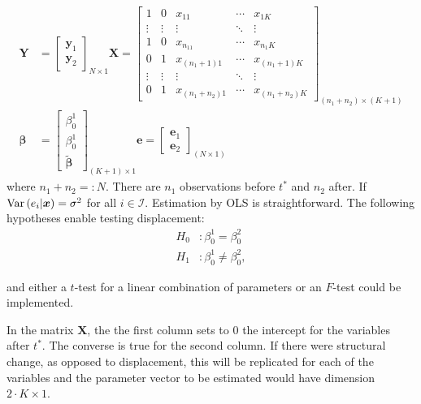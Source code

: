 \begin{align}
	\bm{Y} & = {\begin{bmatrix}
					\bm{y}_1 \\
					\bm{y}_2
			 \end{bmatrix}}_{N \times 1}  
	\bm{X} =  {\begin{bmatrix}
				1      & 0		 & x_{11}   & \cdots & x_{1K}	\\ 
				\vdots & \vdots	 & \vdots 	& \ddots & \vdots   \\
				1 	   & 0 		 & x_{n_11}	& \cdots & x_{n_1K} \\ 
				0      & 1 		 & x_{(n_1+1)1}	& \cdots & x_{(n_1+1)K}	\\ 
				\vdots & \vdots 	 & 	\vdots 	& \ddots & \vdots    \\ 
				0	   & 1 		 & x_{(n_1 + n_2)1}	& \cdots & x_{(n_1 + n_2)K}	
			 \end{bmatrix}}_{(n_1 + n_2) \times (K+1)} \nonumber \\
			 \bm{\beta} & = {\begin{bmatrix}
					{\beta}_0^1 \\
					{\beta}_0^1 \\ 
				 \bm{\tilde{\beta}}
			 \end{bmatrix}}_{(K+1) \times 1}
			\bm{e}  =  {\begin{bmatrix}
					\bm{e}_1 \\
					\bm{e}_2
			 \end{bmatrix}}_{(N \times 1)} 
\end{align}
\noindent where $n_1 + n_2 =: N$. There are $n_1$ observations before $t^*$ and $n_2$ after. If $\operatorname{Var} \left(e_i | \bm{x} \right) = \sigma^2$ for all $i \in \mathcal{I}$. Estimation by OLS is straightforward. The following hypotheses enable testing displacement: 
\begin{align}
	H_0 &: {\beta}_0^1 = {\beta}_0^2 \nonumber \\ 
	H_1 &: {\beta}_0^1 \neq {\beta}_0^2 \nonumber,
\end{align}

\noindent and either a $t$-test for a linear combination of parameters or an $F$-test could be implemented. 

\noindent In the matrix $\bm{X}$, the the first column sets to $0$ the intercept for the variables after $t^*$. The converse is true for the second column. If there were structural change, as opposed to displacement, this will be replicated for each of the variables and the parameter vector to be estimated would have dimension $2 \cdot K \times 1$. 
